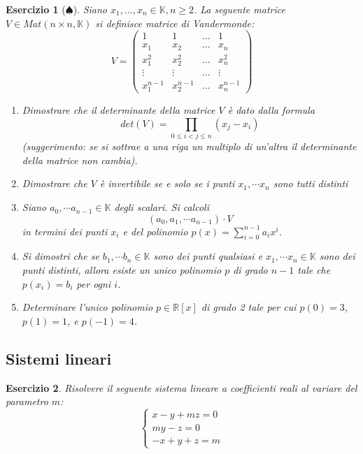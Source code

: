 \documentclass{article}
\newtheorem{es}{Esercizio}
\begin{document}
{\begin{es}[$\spadesuit$]
    Siano $x_1,...,x_n\in \mathbb{K}, n\geq 2$. La seguente matrice $V\in Mat(n \times n, \mathbb{K})$ si definisce matrice di Vandermonde:
    $$
    V=\begin{pmatrix}
        1 & 1 & ... & 1 \\
        x_1 & x_2 & ... & x_n \\
        x_1^2 & x_2^2 & ... & x_n^2 \\
        \vdots & \vdots & ... & \vdots \\
        x_1^{n-1} & x_2^{n-1} & ... & x_n^{n-1}
    \end{pmatrix}
    $$
    \begin{enumerate}
        \item  Dimostrare che il determinante della matrice $V$ è dato dalla formula
    $$ det(V)=\prod _{0\leq i< j \leq n} (x_j-x_i)$$
    (suggerimento: se si sottrae a una riga un multiplo di un'altra il determinante della matrice non cambia).
    \item Dimostrare che $V$ è invertibile se e solo se i punti $x_1,\cdots x_n$ sono tutti distinti
    \item Siano $a_0,\cdots a_{n-1}\in\mathbb{K}$ degli scalari. Si calcoli $$(a_0,a_1,\cdots a_{n-1})\cdot V$$
    in termini dei punti $x_i$ e del polinomio $p(x)=\sum_{i=0}^{n-1} a_i x^i$.
    \item Si dimostri che se $b_1,\cdots b_n\in\mathbb{K}$ sono dei punti qualsiasi e $x_1,\cdots x_n\in \mathbb{K}$ sono dei punti distinti, allora esiste un unico polinomio $p$ di grado $n-1$ tale che $p(x_i)=b_i$ per ogni $i$.
    \item Determinare l'unico polinomio $p\in \mathbb{R}[x]$ di grado 2 tale per cui $p(0)=3$, $p(1)=1$, e $p(-1)=4$.
    \end{enumerate}
\end{es}

\subsection{Sistemi lineari}

\begin{es}
    Risolvere il seguente sistema lineare a coefficienti reali al variare del parametro $m$:
   $$ \begin{cases}
        x-y+mz=0 \\
        my-z=0 \\
        -x+y+z=m
    \end{cases}$$
\end{es}

}
\end{document}
